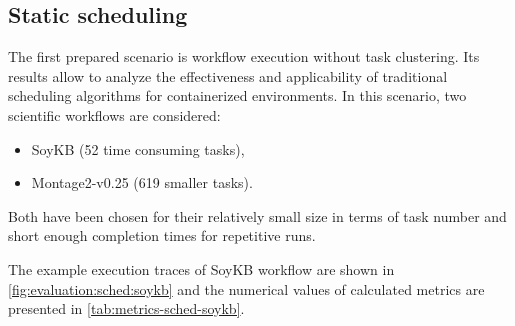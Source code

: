 \subsection{Static scheduling}\label{s:Evaluation:HyperflowScheduler}


The first prepared scenario is workflow execution without task clustering.
Its results allow to analyze the effectiveness and applicability of traditional scheduling algorithms for containerized environments.
In this scenario, two scientific workflows are considered:

\begin{itemize}[topsep=0pt]
  \item{
SoyKB (52 time consuming tasks),
}
  \item{
Montage2-v0.25 (619 smaller tasks).
}
\end{itemize}
Both have been chosen for their relatively small size in terms of task number and short enough completion times for repetitive runs.


The example execution traces of SoyKB workflow are shown in \cref{fig:evaluation:sched:soykb} and the numerical values of calculated metrics are presented in \cref{tab:metrics-sched-soykb}.




